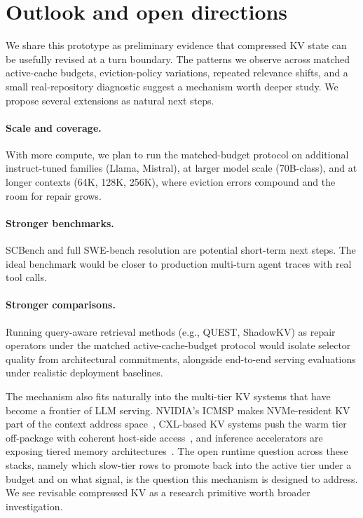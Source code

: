 \documentclass{article}
\begin{document}
\clearpage
\appendix
\raggedbottom

\section{\texorpdfstring{{Outlook and open directions}}{Outlook and open directions}}
\label{app:outlook}

{We share this prototype as preliminary evidence that compressed KV state can be usefully revised at a turn boundary.
The patterns we observe across matched active-cache budgets, eviction-policy variations, repeated relevance shifts, and a small real-repository diagnostic suggest a mechanism worth deeper study.
We propose several extensions as natural next steps.

\paragraph{Scale and coverage.}
With more compute, we plan to run the matched-budget protocol on additional instruct-tuned families (Llama, Mistral), at larger model scale (70B-class), and at longer contexts (64K, 128K, 256K), where eviction errors compound and the room for repair grows.

\paragraph{Stronger benchmarks.}
SCBench and full SWE-bench resolution are potential short-term next steps.
The ideal benchmark would be closer to production multi-turn agent traces with real tool calls.

\paragraph{Stronger comparisons.}
Running query-aware retrieval methods (e.g., QUEST, ShadowKV) as repair operators under the matched active-cache-budget protocol would isolate selector quality from architectural commitments, alongside end-to-end serving evaluations under realistic deployment baselines.

The mechanism also fits naturally into the multi-tier KV systems that have become a frontier of LLM serving.
NVIDIA's ICMSP makes NVMe-resident KV part of the context address space~\citep{icmsp2026}, CXL-based KV systems push the warm tier off-package with coherent host-side access~\citep{cxlkv2025,tract2025,cxlspeckv2025}, and inference accelerators are exposing tiered memory architectures~\citep{dmatrix2025,sambanova2024}.
The open runtime question across these stacks, namely which slow-tier rows to promote back into the active tier under a budget and on what signal, is the question this mechanism is designed to address.
We see revisable compressed KV as a research primitive worth broader investigation.
}
\end{document}
